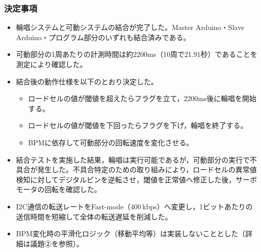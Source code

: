 \documentclass[a4paper,12pt]{ltjsarticle}
\begin{document}
\subsubsection*{決定事項}
\begin{itemize}[leftmargin=1.5em]
  \item 輪唱システムと可動システムの結合が完了した。Master Arduino・Slave Arduino・プログラム部分のいずれも結合済みである。
  \item 可動部分の1周あたりの計測時間は約2200ms（10周で21.91秒）であることを測定により確認した。
  \item 結合後の動作仕様を以下のとおり決定した。
  \begin{itemize}
    \item ロードセルの値が閾値を超えたらフラグを立て，2200ms後に輪唱を開始する。
    \item ロードセルの値が閾値を下回ったらフラグを下げ，輪唱を終了する。
    \item BPMに依存して可動部分の回転速度を変化させる。
  \end{itemize}
  \item 結合テストを実施した結果，輪唱は実行可能であるが，可動部分の実行で不具合が発生した。不具合特定のための取り組みにより，ロードセルの異常値検知に対してデジタルピンを逆転させ，閾値を正常値へ修正した後，サーボモータの回転を確認した。
  \item I2C通信の転送レートをFast-mode（400\,kbps）へ変更し，1ビットあたりの送信時間を短縮して全体の転送遅延を削減した。
  \item BPM変化時の平滑化ロジック（移動平均等）は実装しないこととした（詳細は議題②を参照）。
\end{itemize}
\end{document}
